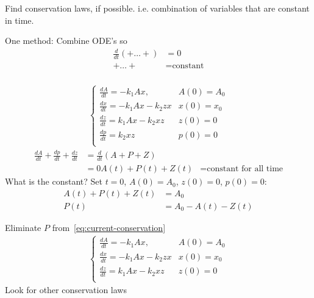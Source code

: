 \documentclass[
	date={October 21{,} 2024},
	month={10},
	day={21}
]{math486notes}
\begin{document}
\tableofcontents

Find conservation laws, if possible.
i.e. combination of variables that are constant in time.

One method: Combine
ODE's so
\begin{equation*}
\begin{aligned}
	\frac{d}{dt}(+\dots+) &= 0\\
	+\dots+ &= \mbox{constant}\\
\end{aligned}
\end{equation*}

\begin{equation}
	\begin{aligned}
		\left\{ \begin{array}{ll}
			\frac{dA}{dt} = -k_{1}Ax, & A(0) = A_{0}\\
			\frac{dx}{dt} = -k_{1}Ax- k_{2}zx & x(0) = x_{0}\\
			\frac{dz}{dt} = k_{1}Ax - k_{2}xz & z(0) = 0\\
			\frac{dp}{dt} = k_{2}xz & p(0) = 0\\
		\end{array} \right.
	\end{aligned}
	\label{eq:current-conservation}
\end{equation}
\begin{equation*}
\begin{aligned}
	\frac{dA}{dt} + \frac{dp}{dt} + \frac{dz}{dt} &= \frac{d}{dt}(A + P + Z)\\
	&=0
	A(t) + P(t) + Z(t) &= \mbox{constant for all time}
\end{aligned}
\end{equation*}
What is the constant?
Set $t=0$, $A(0)=A_{0}$, $z(0)=0$, $p(0)=0$:
\begin{equation*}
\begin{aligned}
	A(t) + P(t) + Z(t) &= A_{0}\\
	P(t) &= A_{0} - A(t) - Z(t)
\end{aligned}
\end{equation*}

Eliminate $P$ from~\eqref{eq:current-conservation}
\begin{equation}
	\begin{aligned}
		\left\{ \begin{array}{ll}
					\frac{dA}{dt} = -k_{1}Ax, & A(0) = A_{0}\\
					\frac{dx}{dt} = -k_{1}Ax- k_{2}zx & x(0) = x_{0}\\
					\frac{dz}{dt} = k_{1}Ax - k_{2}xz & z(0) = 0\\
		\end{array} \right.
	\end{aligned}
	\label{eq:current-conservation-2}
\end{equation}
Look for other conservation laws
\end{document}
